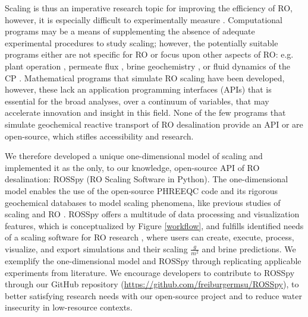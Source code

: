 Scaling is thus an imperative research topic for improving the efficiency of RO, however, it is especially difficult to experimentally measure \cite{Hu2014Real-timeSpectroscopy,Butt1995IdentificationAutopsy,Sheikholeslami2003KineticsM}. Computational programs \cite{Giere2009IsExperimentation,Wijmans1995TheReview} may be a means of supplementing the absence of adequate experimental procedures \cite{Strubbe2018CalibrationFull-Scale,Lenhard2007ComputerModeling} to study scaling; however, the potentially suitable programs either are not specific for RO \cite{2018ZeroPHREEQC} or focus upon other aspects of RO: e.g. plant operation \cite{DesalitechROSASoftware,Chee2018PerformanceSoftware,SysCAD2020PHREEQCUnit,Bouchareb2019ExperimentalDesalination}, permeate flux \cite{Xu2012TOUGHREACT.0,Steefel2015ReactiveSimulation}, brine geochemistry \cite{Kundu2018TechnicalTechnology}, or fluid dynamics of the CP \cite{Walker2003AssessmentReaction}. Mathematical programs that simulate RO scaling  have been developed, however, these lack an application programming interfaces (APIs) that is essential for the broad analyses, over a continuum of variables, that may accelerate innovation and insight in this field. None of the few programs that simulate geochemical reactive transport of RO desalination \cite{SoftwareReverseOsmosis} provide an API or are open-source, which stifles accessibility and research. 

We therefore developed a unique one-dimensional model of scaling and implemented it as the only, to our knowledge, open-source API of RO desalination: ROSSpy (RO Scaling Software in Python). The one-dimensional model enables the use of the open-source PHREEQC code \cite{Parkhurst2015PhreeqcRM:PHREEQC,Charlton2011ModulesLanguages} and its rigorous geochemical databases to model scaling phenomena, like previous studies of scaling \cite{Mitrouli2016CalciumExperiments,Warsinger2018InorganicOsmosis} and RO \cite{Bein1993OriginBrine,Wilson1993GeochemistryFormations,Casas2012SeawaterElectrodialysis,Yan2017ReverseVelocity}. ROSSpy offers a multitude of data processing and visualization features, which is conceptualized by Figure \ref{workflow}, and fulfills identified needs of a scaling software for RO research \cite{Karabelas2020ScalingTools}, where users can create, execute, process, visualize, and export simulations and their scaling $\frac{g}{m^2}$ and brine predictions. We exemplify the one-dimensional model and ROSSpy through replicating applicable experiments from literature. We encourage developers to contribute to ROSSpy through our GitHub repository (\url{https://github.com/freiburgermsu/ROSSpy}), to better satisfying research needs with our open-source project and to reduce water insecurity in low-resource contexts. 


